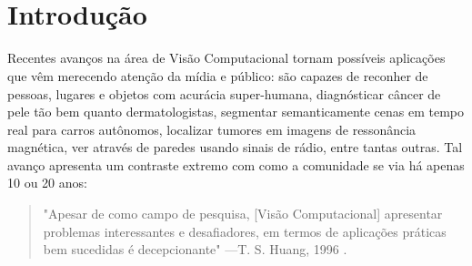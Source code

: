 \documentclass[
12pt, %
a4paper, %
onecolumn, %
]{article}
\begin{document}
\pagestyle{myheadings} %


\thispagestyle{plain} %

\printcover %

\begin{center}

  \horrule{0.5pt} \\[0.4cm] %

  \bigskip

  \textbf{\Large{\doctitle}}
  
  \bigskip
  
  \docauthor

  \bigskip
  

  \horrule{2pt} \\[0.5cm] %

\end{center}

\thispagestyle{plain}
\setcounter{page}{2}
\onehalfspacing

\section{Introdução}

Recentes avanços na área de Visão Computacional tornam possíveis aplicações que vêm merecendo atenção da mídia e público:  são capazes de reconher de pessoas, lugares e objetos com acurácia super-humana\cite{fei}, diagnósticar câncer de pele tão bem quanto dermatologistas\cite{fred}, segmentar semanticamente cenas em tempo real para carros autônomos, localizar tumores em imagens de ressonância magnética, ver através de paredes usando sinais de rádio, entre tantas outras. Tal avanço apresenta um contraste extremo com como a comunidade se via há apenas 10 ou 20 anos: 
\begin{quote}"Apesar de como campo de pesquisa, [Visão Computacional] apresentar problemas interessantes e desafiadores, em termos de aplicações práticas bem sucedidas é decepcionante" \hfill ---T. S. Huang,  1996 \cite{huang1996}.  \end{quote}
\end{document}
